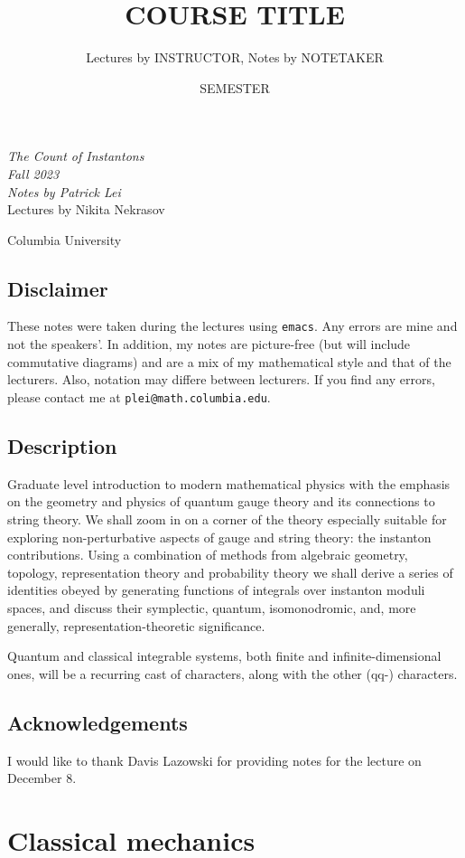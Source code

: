 \documentclass[leqno, openany]{memoir}
\title{COURSE TITLE}
\author{Lectures by INSTRUCTOR, Notes by NOTETAKER}
\date{SEMESTER}
\theoremstyle{definition}
\theoremstyle{remark}
\theoremstyle{plain}
\theoremstyle{definition}
\theoremstyle{remark}
\newcommand*{\titleSW}
    {\begingroup%
    \raggedleft
    \vspace*{\baselineskip}
    {\Huge\itshape The Count of Instantons \\ Fall 2023}\\[\baselineskip]
    {\large\itshape Notes by Patrick Lei}\\[0.2\textheight]
    {\Large Lectures by Nikita Nekrasov}\par
    \vfill
    {\Large \sffamily Columbia University}
    \vspace*{\baselineskip}
\endgroup}
\begin{document}
    
\begin{titlingpage}
\titleSW
\end{titlingpage}

\thispagestyle{empty}
\section*{Disclaimer}%
\label{sec:disclaimer}

These notes were taken during the lectures using \texttt{emacs}. 
Any errors are mine and not the speakers'. 
In addition, my notes are picture-free (but will include commutative diagrams) and are a mix of my mathematical style and that of the lecturers. Also, notation may differe between lecturers.
If you find any errors, please contact me at \texttt{plei@math.columbia.edu}.

\section*{Description}

Graduate level introduction to modern mathematical physics with the emphasis on the geometry and physics of quantum gauge theory and its connections to string theory.  We shall zoom in on a corner of the theory especially suitable for exploring non-perturbative aspects of gauge and string theory: the instanton contributions. Using a combination of methods from algebraic geometry, topology, representation theory and probability theory we shall derive a series of identities obeyed by generating functions of integrals over instanton moduli spaces, and discuss their symplectic, quantum, isomonodromic, and, more generally, representation-theoretic significance.

Quantum and classical integrable systems, both finite and infinite-dimensional ones, will be a recurring cast of characters, along with the other (qq-) characters.

\section*{Acknowledgements}
I would like to thank Davis Lazowski for providing notes for the lecture on December 8.


\newpage

\tableofcontents

\chapter{Classical mechanics}
\label{cha:intro}
\end{document}

